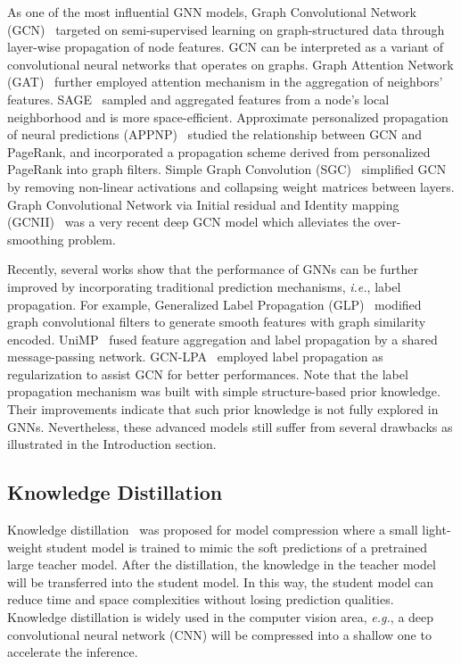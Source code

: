 \documentclass[sigconf]{acmart}
\begin{document}
As one of the most influential GNN models, Graph Convolutional Network (GCN)~\cite{kipf2016semi} targeted on semi-supervised learning on graph-structured data through layer-wise propagation of node features. GCN can be interpreted as a variant of convolutional neural networks that operates on graphs. Graph Attention Network (GAT)~\cite{velivckovic2018graph} further employed attention mechanism in the aggregation of neighbors' features. SAGE~\cite{hamilton2017inductive} sampled and aggregated features from a node's local neighborhood and is more space-efficient. Approximate personalized propagation of neural predictions (APPNP)~\cite{klicpera2018predict} studied the relationship between GCN and PageRank, and incorporated a propagation scheme derived from personalized PageRank into graph filters. Simple Graph Convolution (SGC)~\cite{wu2019simplifying} simplified GCN by removing non-linear activations and collapsing weight matrices between layers. Graph Convolutional Network via Initial residual and Identity mapping (GCNII)~\cite{chen2020simple} was a very recent deep GCN model which alleviates the over-smoothing problem. 

Recently, several works show that the performance of GNNs can be further improved by incorporating traditional prediction mechanisms, \textit{i.e.}, label propagation. For example, Generalized Label Propagation (GLP)~\cite{li2019label} modified graph convolutional filters to generate smooth features with graph similarity encoded. UniMP~\cite{shi2020masked} fused feature aggregation and label propagation by a shared message-passing network. GCN-LPA~\cite{wang2020unifying} employed label propagation as regularization to assist GCN for better performances. Note that the label propagation mechanism was built with simple structure-based prior knowledge. Their improvements indicate that such prior knowledge is not fully explored in GNNs. Nevertheless, these advanced models still suffer from several drawbacks as illustrated in the Introduction section.
\subsection{Knowledge Distillation}
Knowledge distillation~\cite{hinton2015distilling} was proposed for model compression where a small light-weight student model is trained to mimic the soft predictions of a pretrained large teacher model. After the distillation, the knowledge in the teacher model will be transferred into the student model. In this way, the student model can reduce time and space complexities without losing prediction qualities. Knowledge distillation is widely used in the computer vision area, \textit{e.g.}, a deep convolutional neural network (CNN) will be compressed into a shallow one to accelerate the inference.
\end{document}
